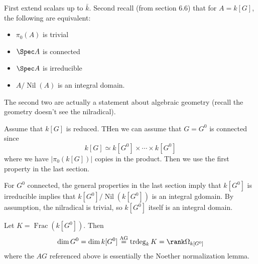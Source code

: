 \documentclass[12pt]{article}
\begin{document}
\begin{prf}
	First extend scalars up to $\bar k$. Second recall (from section 6.6) that for $A=k[G]$, the following are equivalent:
	\begin{itemize}
		\item $\pi_0(A)$ is trivial
		\item $\Spec A$ is connected
		\item $\Spec A$ is irreducible
		\item $A/\operatorname{Nil}(A)$ is an integral domain.
	\end{itemize}
	The second two are actually a statement about algebraic geometry (recall the geometry doesn't see the nilradical).

	Assume that $k[G]$ is reduced. THen we can assume that $G=G^0$ is connected since 
	\[k[G]\simeq k[G^0]\times\cdots\times k[G^0]\]
	where we have $|\pi_0(k[G])|$ copies in the product. Then we use the first property in the last section.

	For $G^0$ connected, the general properties in the last section imply that $k[G^0]$ is irreducible implies that $k[G^0]/\operatorname{Nil}(k[G^0])$ is 
	an integral gdomain. By assumption, the nilradical is trivial, so $k[G^0]$ itself is an integral domain.

	Let $K=\operatorname{Frac}(k[G^0])$. Then
	\[\dim G^0=\dim k[G^0]\stackrel{\text{AG}}{=}\operatorname{trdeg}_kK=\rank \Omega_{k[G^0]}\]
	where the $AG$ referenced above is essentially the Noether normalization lemma.
\end{prf}
\end{document}
